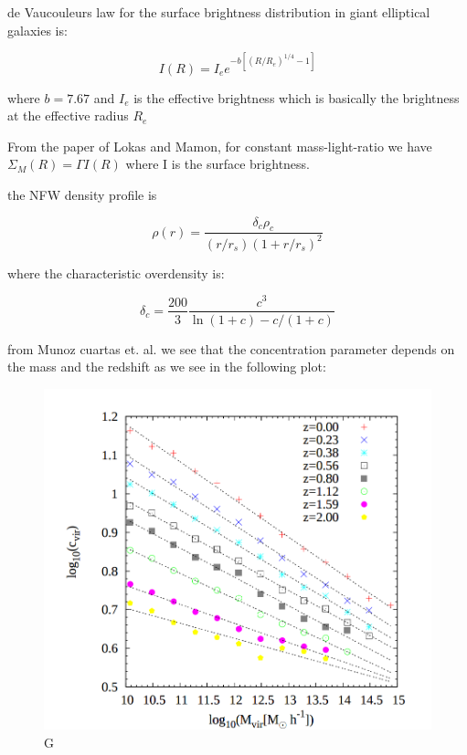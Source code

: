 de Vaucouleurs law for the surface brightness distribution in giant elliptical galaxies is:

\begin{equation}
I(R)=I_{e}e^{-b\left[\left(R/R_{e}\right)^{1/4}-1\right]}
\end{equation}

where $b=7.67$ and $I_{e}$ is the effective brightness which is basically the brightness at the effective radius $R_{e}$

From the paper of Lokas and Mamon, for constant mass-light-ratio we have $\Sigma_{M}(R)=\Gamma I(R)$ where I is the surface brightness.

the NFW density profile is 

\begin{equation}
\rho(r)=\frac{\delta_{c}\rho_{c}}{(r/r_{s})(1+r/r_{s})^{2}}
\end{equation}

where the characteristic overdensity is:

\begin{equation}
\delta_{c}=\frac{200}{3}\frac{c^{3}}{\ln{(1+c)}-c/(1+c)}
\end{equation}

from Munoz cuartas et. al. we see that the concentration parameter depends on the mass and the redshift as we see in the following plot:

\begin{figure}[H]
\centering
\includegraphics[width=12cm]{images/juank.png}
\caption[M]{G}
\end{figure}


